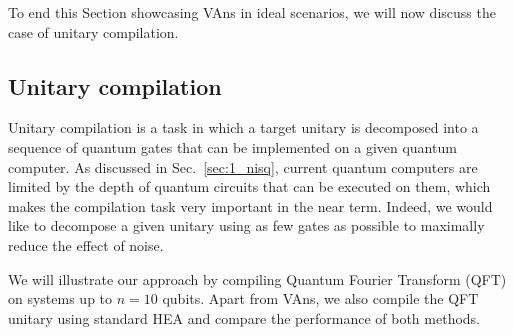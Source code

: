 To end this Section showcasing VAns in ideal scenarios, we will now discuss the case of unitary compilation.

\subsection{Unitary compilation} \label{sec:unitary_compilation}
Unitary compilation is a task in which a target unitary is decomposed into a sequence of quantum gates that can be implemented on a given quantum computer. As discussed in Sec.~\ref{sec:1_nisq}, current quantum computers are limited by the depth of quantum circuits that can be executed on them, which makes the compilation task very important in the near term. Indeed, we would like to decompose a given unitary using as few gates as possible to maximally reduce the effect of noise. %

We will illustrate our approach by compiling Quantum Fourier Transform (QFT) on systems up to $n=10$ qubits. Apart from VAns, we also compile the QFT unitary using standard HEA and compare the performance of both methods.

